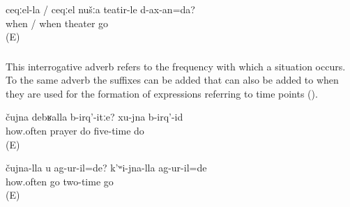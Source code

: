 %
\begin{exe}
	\ex	\label{ex:When will we go to the theater?}
	\gll	ceqːel-la	/	ceqːel	nušːa	teatir-le	d-ax-an=da?\\
		when	/	when		theater	go\\
	\glt	{} (E)
\end{exe}



\subsubsection{ }
\label{sssec:cujna how many times}

This interrogative adverb refers to the frequency with which a situation occurs. To the same adverb the suffixes can be added that can also be added to  when they are used for the formation of expressions referring to time points  ().
%
\begin{exe}
	\ex	\label{ex:How many times do you pray (every day)? I pray five times}
	\gll	čujna	debʁalla	b-irq'-itːe? 	xu-jna	b-irq'-id\\
		how.often	prayer	do 	five-time	do\\
	\glt	{} (E)
\end{exe}

%
\begin{exe}
	\ex	\label{ex:At which time did you go? I went at the second time.}
	\gll	čujna-lla	u	ag-ur-il=de?	k'ʷi-jna-lla	ag-ur-il=de\\
		how.often		go	two-time	go\\
	\glt	{} (E)
\end{exe}



